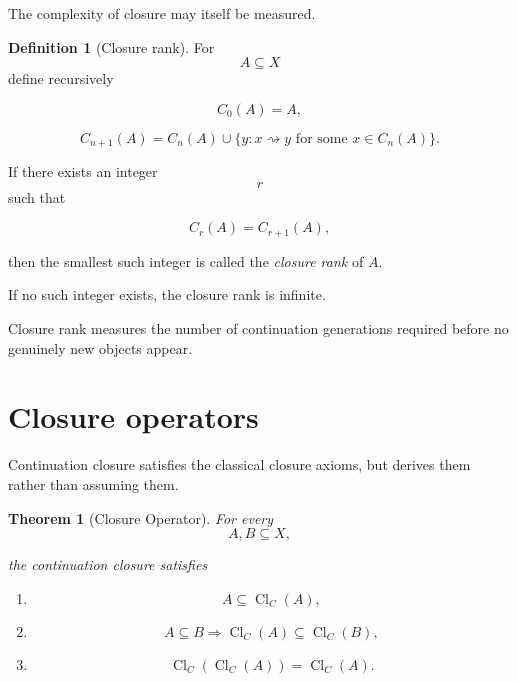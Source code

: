 \documentclass[13pt,openany]{book}
\theoremstyle{plain}
\newtheorem{theorem}{Theorem}[chapter]
\theoremstyle{definition}
\newtheorem{definition}{Definition}[chapter]
\begin{document}
The complexity of closure may itself be measured.

\begin{definition}[Closure rank]

For
\[
A\subseteq X
\]
define recursively

\[
C_0(A)=A,
\]

\[
C_{n+1}(A)
=
C_n(A)
\cup
\{
y:
x\rightsquigarrow y
\text{ for some }
x\in C_n(A)
\}.
\]

If there exists an integer
\[
r
\]
such that

\[
C_r(A)=C_{r+1}(A),
\]

then the smallest such integer is called the
\emph{closure rank}
of \(A\).

If no such integer exists,
the closure rank is infinite.

\end{definition}

Closure rank measures the number of continuation generations required before
no genuinely new objects appear.


\section{Closure operators}

Continuation closure satisfies the classical closure axioms, but derives them
rather than assuming them.

\begin{theorem}[Closure Operator]

For every
\[
A,B\subseteq X,
\]

the continuation closure satisfies

\begin{enumerate}

\item
\[
A
\subseteq
\operatorname{Cl}_C(A),
\]

\item
\[
A\subseteq B
\Longrightarrow
\operatorname{Cl}_C(A)
\subseteq
\operatorname{Cl}_C(B),
\]

\item
\[
\operatorname{Cl}_C
(\operatorname{Cl}_C(A))
=
\operatorname{Cl}_C(A).
\]

\end{enumerate}

\end{theorem}
\end{document}
